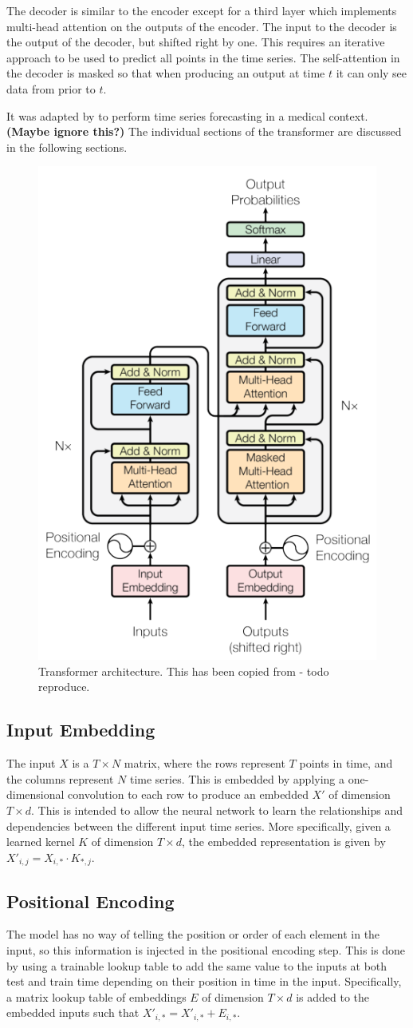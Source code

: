 \documentclass[conference]{IEEEtran}
\begin{document}
The decoder is similar to the encoder except for a third layer which implements multi-head attention on the outputs of the encoder.
The input to the decoder is the output of the decoder, but shifted right by one.
This requires an iterative approach to be used to predict all points in the time series.
The self-attention in the decoder is masked so that when producing an output at time $t$ it can only see data from prior to $t$.

It was adapted by \cite{Song2017} to perform time series forecasting in a medical context. \textbf{(Maybe ignore this?)}
The individual sections of the transformer are discussed in the following sections.

\begin{figure}[htbp]
	\centerline{\includegraphics[width=.35\textwidth]{images/transformer_vaswani_copied.png}}
	\caption{Transformer architecture. This has been copied from \cite{Vaswani2017} - todo reproduce.}
	\label{fig:transformer}
\end{figure}

\subsection{Input Embedding}
The input $X$ is a $T \times N$ matrix, where the rows represent $T$ points in time, and the columns represent $N$ time series.
This is embedded by applying a one-dimensional convolution to each row to produce an embedded $X'$ of dimension $T \times d$.
This is intended to allow the neural network to learn the relationships and dependencies between the different input time series.
More specifically, given a learned kernel $K$ of dimension $T \times d$, the embedded representation is given by $X'_{i, j} = X_{i,*} \cdot K_{*, j}$.

\subsection{Positional Encoding}
The model has no way of telling the position or order of each element in the input, so this information is injected in the positional encoding step.
This is done by using a trainable lookup table to add the same value to the inputs at both test and train time depending on their position in time in the input.
Specifically, a matrix lookup table of embeddings $E$ of dimension $T \times d$ is added to the embedded inputs such that $X'_{i,*} = X'_{i,*} + E_{i,*}$.
\end{document}
